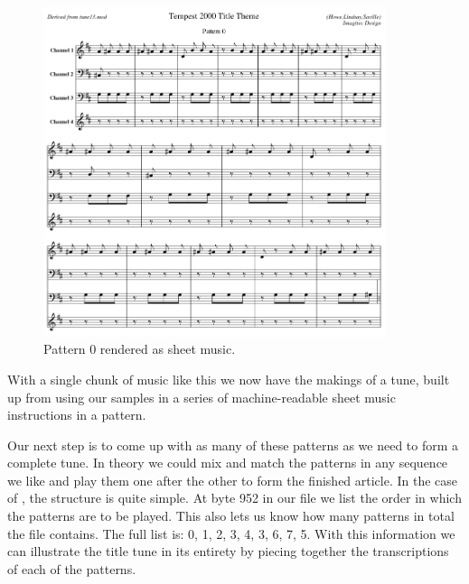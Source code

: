 \begin{figure}[H]
  \centering
        \includegraphics[width=10cm]{src/titletune/sheet_music/title_no_0_page_1001.png}%
  \caption*{Pattern 0 rendered as sheet music.}
\end{figure}


With a single chunk of music like this we now have the makings of a tune, built up from using our samples in a series of 
machine-readable sheet music instructions in a pattern.

 Our next step is to come up with as many of these patterns
as we need to form a complete tune. In theory we could mix and match the patterns in any sequence we like and play
them one after the other to form the finished article. In the 
case of , the structure is quite simple. At byte 952 in our  file we list the
order in which the patterns are to be played. This also lets us know how many patterns in total the file contains.
The full list is: 0, 1, 2, 3, 4, 3, 6, 7, 5. With this information we can illustrate the title tune in its
entirety by piecing together the transcriptions of each of the patterns. 
 
